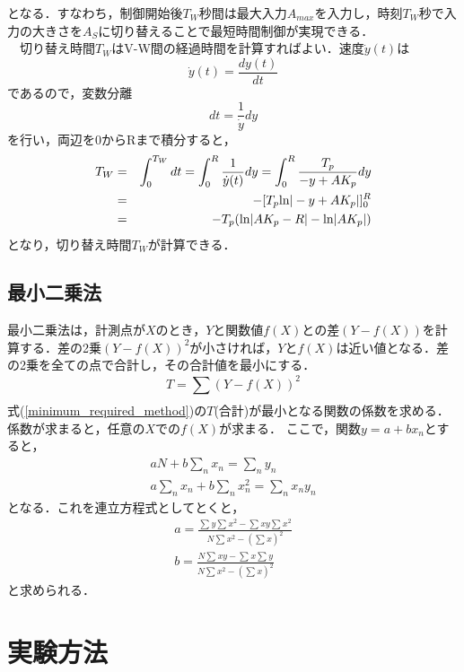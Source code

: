 \documentclass[12pt]{jsarticle}
\begin{document}
となる．すなわち，制御開始後$T_W$秒間は最大入力$A_{max}$を入力し，時刻$T_W$秒で入力の大きさを$A_S$に切り替えることで最短時間制御が実現できる．\\
　切り替え時間$T_W$はV-W間の経過時間を計算すればよい．速度$\dot{y}(t)$は
\begin{equation}
  \label{C17}
  \dot{y}(t)=\frac{dy(t)}{dt}
\end{equation}
であるので，変数分離
\begin{equation}
  \label{C18}
  dt = \frac{1}{\dot{y}}dy
\end{equation}
を行い，両辺を0からRまで積分すると，
\begin{eqnarray}
  \label{C19}
  T_W & = & \int_0^{T_W} dt = \int_0^R \frac{1}{\dot{y}(t)} dy = \int_0^R \frac{T_p}{-y+AK_p} dy\\
  & = & -[T_p {\rm ln}|-y+AK_p|]^R_0\\
  & = & -T_p({\rm ln}|AK_p-R|-{\rm ln}|AK_p|)
\end{eqnarray}
となり，切り替え時間$T_W$が計算できる．
\subsection{最小二乗法}
最小二乗法は，計測点が$X$のとき，$Y$と関数値$f(X)$との差$(Y-f(X))$を計算する．差の2乗$(Y-f(X))^2$が小さければ，$Y$と$f(X)$は近い値となる．差の2乗を全ての点で合計し，その合計値を最小にする．
\begin{equation}
  \label{minimum_required_method}
  T = \sum_{}^{}(Y-f(X))^2
\end{equation}
式(\ref{minimum_required_method})の$T$(合計)が最小となる関数の係数を求める．係数が求まると，任意の$X$での$f(X)$が求まる\cite{minimum_method}．
ここで，関数$y = a + bx_n$とすると，
\begin{eqnarray}
  \label{minimum_method}
  aN + b\sum_{n}^{}x_n = \sum_{n}^{}y_n \\
  a\sum_{n}^{}x_n + b\sum_{n}^{}x_n^2 = \sum_{n}^{}x_ny_n
\end{eqnarray}
となる．これを連立方程式としてとくと，
\begin{eqnarray}
a = \frac{\sum{}^{}y \sum{}^{}x^2 - \sum{}^{}xy\sum{}^{}x^2}{N\sum_{}^{}x^2 - (\sum_{}^{}x)^2}\\
b = \frac{N\sum{}^{}xy - \sum{}^{}x\sum{}^{}y}{N\sum_{}^{}x^2 - (\sum_{}^{}x)^2}
\end{eqnarray}
と求められる．

\section{実験方法}
\end{document}
